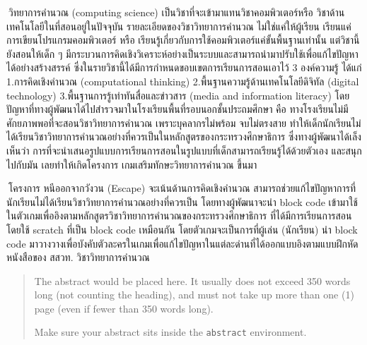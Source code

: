 \maketitle
\makesignature

\ifproject
\begin{abstractTH}

$\>$วิทยาการคำนวณ (computing science) เป็นวิชาที่จะเข้ามาแทนวิชาคอมพิวเตอร์หรือ วิชาด้านเทคโนโลยีในที่สอนอยู่ในปัจจุบัน 
รายละเอียดของวิชาวิทยาการคำนวณ ไม่ใช่แค่ให้ผู้เรียน เรียนแค่การเขียนโปรแกรมคอมพิวเตอร์ หรือ เรียนรู้เกี่ยวกับการใช้คอมพิวเตอร์แค่ขั้นพื้นฐานเท่านั้น 
แต่วิชานี้ยังสอนให้เด็ก ๆ มีกระบวนการคิดเชิงวิเคราะห์อย่างเป็นระบบและสามารถนำมาปรับใช้เพื่อแก้ไขปัญหาได้อย่างสร้างสรรค์ 
ซึ่งในรายวิชานี้ได้มีการกำหนดขอบเขตการเรียนการสอนเอาไว้ 3 องค์ความรู้ ได้แก่ 1.การคิดเชิงคำนวณ 
(computational thinking) 2.พื้นฐานความรู้ด้านเทคโนโลยีดิจิทัล (digital technology) 
3.พื้นฐานการรู้เท่าทันสื่อและข่าวสาร (media and information literacy) 
โดยปัญหาที่ทางผู้พัฒนาได้ไปสำรวจมาในโรงเรียนพื้นที่รอบนอกชั้นประถมศึกษา คือ ทางโรงเรียนไม่มีศักยภาพพอที่จะสอนวิชาวิทยาการคำนวณ 
เพราะบุคลากรไม่พร้อม จบไม่ตรงสาย ทำให้เด็กนักเรียนไม่ได้เรียนวิชาวิทยาการคำนวณอย่างที่ควรเป็นในหลักสูตรของกระทรวงศึกษาธิการ 
ซึ่งทางผู้พัฒนาได้เล็งเห็นว่า การที่จะนำเสนอรูปแบบการเรียนการสอนในรูปแบบที่เด็กสามารถเรียนรู้ได้ด้วยตัวเอง และสนุกไปกับมัน 
เลยทำให้เกิดโครงการ เกมเสริมทักษะวิทยาการคำนวณ ขึ้นมา

$\>$โครงการ หนีออกจากวังวน (Escape) จะเน้นด้านการคิดเชิงคำนวณ 
สามารถช่วยแก้ไขปัญหาการที่นักเรียนไม่ได้เรียนวิชาวิทยาการคำนวณอย่างที่ควรเป็น 
โดยทางผู้พัฒนาจะนำ block code เข้ามาใช้ในตัวเกมเพื่ออิงตามหลักสูตรวิชาวิทยาการคำนวณของกระทรวงศึกษาธิการ 
ที่ได้มีการเรียนการสอนโดยใช้ scratch ที่เป็น block code เหมือนกัน 
โดยตัวเกมจะเป็นการที่ผู้เล่น (นักเรียน) นำ block code มาวางวางเพื่อบังคับตัวละครในเกมเพื่อแก้ไขปัญหาในแต่ละด่านที่ได้ออกแบบอิงตามแบบฝึกหัดหนังสือของ 
สสวท. วิชาวิทยาการคำนวณ
\end{abstractTH}

\begin{abstract}
The abstract would be placed here. It usually does not exceed 350 words
long (not counting the heading), and must not take up more than one (1) page
(even if fewer than 350 words long).

Make sure your abstract sits inside the \texttt{abstract} environment.
\end{abstract}

